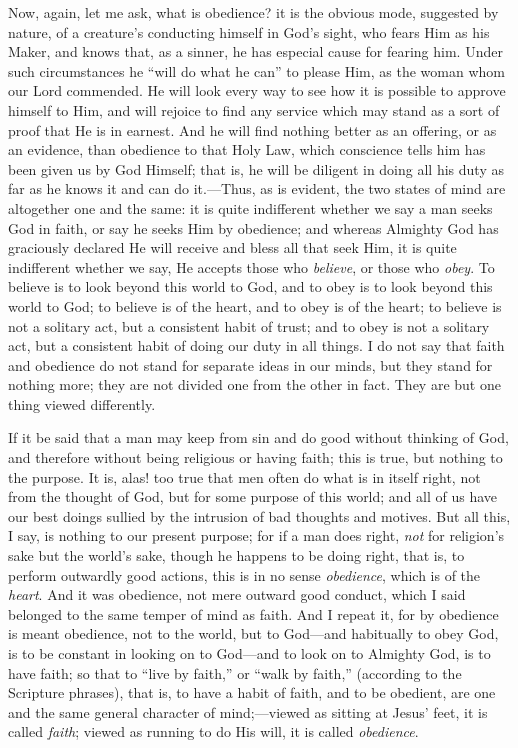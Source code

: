 Now, again, let me ask, what is obedience? it is the obvious mode,
suggested by nature, of a creature's conducting himself in God's
sight, who fears Him as his Maker, and knows that, as a sinner, he has
especial cause for fearing him. Under such circumstances he ``will
do what he can'' to please Him, as the woman whom our Lord
commended. He will look every way to see how it is possible to approve
himself to Him, and will rejoice to find any service which may stand
as a sort of proof that He is in earnest. And he will find nothing
better as an offering, or as an evidence, than obedience to that Holy
Law, which conscience tells him has been given us by God Himself; that
is, he will be diligent in doing all his duty as far as he knows it
and can do it.—Thus, as is evident, the two states of mind are
altogether one and the same: it is quite indifferent whether we say a
man seeks God in faith, or say he seeks Him by obedience; and whereas
Almighty God has graciously declared He will receive and bless all
that seek Him, it is quite indifferent whether we say, He accepts
those who \emph{believe}, or those who \emph{obey}. To believe is to
look beyond this world to God, and to obey is to look beyond this
world to God; to believe is of the heart, and to obey is of the heart;
to believe is not a solitary act, but a consistent habit of trust; and
to obey is not a solitary act, but a consistent habit of doing our
duty in all things. I do not say that faith and obedience do not stand
for separate ideas in our minds, but they stand for nothing more; they
are not divided one from the other in fact. They are but one thing
viewed differently.

If it be said that a man may keep from sin and do good without
thinking of God, and therefore without being religious or having
faith; this is true, but nothing to the purpose. It is, alas! too true
that men often do what is in itself right, not from the thought of
God, but for some purpose of this world; and all of us have our best
doings sullied by the intrusion of bad thoughts and motives. But all
this, I say, is nothing to our present purpose; for if a man does
right, \emph{not} for religion's sake but the world's sake, though
he happens to be doing right, that is, to perform outwardly good
actions, this is in no sense \emph{obedience}, which is of the \emph{heart}.
And it was obedience, not mere outward good conduct, which I said
belonged to the same temper of mind as faith. And I repeat it, for by
obedience is meant obedience, not to the world, but to God—and
habitually to obey God, is to be constant in looking on to God—and
to look on to Almighty God, is to have faith; so that to ``live by
faith,'' or ``walk by faith,'' (according to the Scripture
phrases), that is, to have a habit of faith, and to be obedient, are
one and the same general character of mind;—viewed as sitting at
Jesus' feet, it is called \emph{faith}; viewed as running to do His
will, it is called \emph{obedience}.

